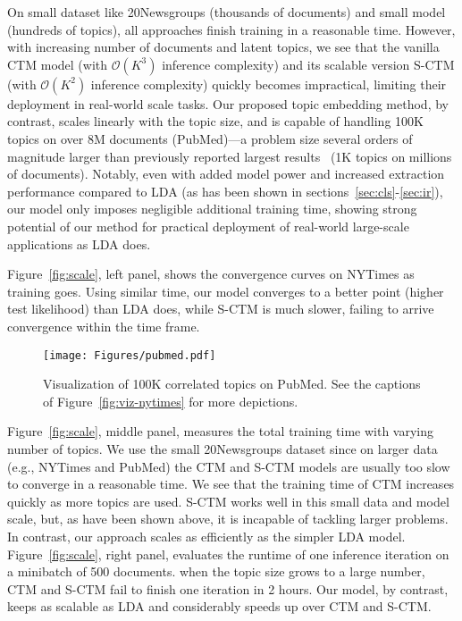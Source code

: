 \documentclass[sigconf]{acmart}
\begin{document}
On small dataset like 20Newsgroups (thousands of documents) and small model (hundreds of topics), all approaches finish training in a reasonable time. However, with increasing number of documents and latent topics, we see that the vanilla CTM model (with $\mathcal{O}(K^3)$ inference complexity) and its scalable version S-CTM (with $\mathcal{O}(K^2)$ inference complexity) quickly becomes impractical, limiting their deployment in real-world scale tasks. Our proposed topic embedding method, by contrast, scales linearly with the topic size, and is capable of handling 100K topics on over 8M documents (PubMed)---a problem size several orders of magnitude larger than previously reported largest results~\cite{chen2013scalable} (1K topics on millions of documents). Notably, even with added model power and increased extraction performance compared to LDA (as has been shown in sections~\ref{sec:cls}-\ref{sec:ir}), our model only imposes negligible additional training time, showing strong potential of our method for practical deployment of real-world large-scale applications as LDA does. 

Figure~\ref{fig:scale}, left panel, shows the convergence curves on NYTimes as training goes. Using similar time, our model converges to a better point (higher test likelihood) than LDA does, while S-CTM is much slower, failing to arrive convergence within the time frame.


\begin{figure}[!h]
\begin{center}
\texttt{[image: Figures/pubmed.pdf]}
\vspace{-10pt}
\caption{Visualization of 100K correlated topics on PubMed. See the captions of Figure~\ref{fig:viz-nytimes} for more depictions.}
\label{fig:pubmed}
\end{center}
\vspace{-10pt}
\end{figure}
%
Figure~\ref{fig:scale}, middle panel, measures the total training time with varying number of topics. We use the small 20Newsgroups dataset since on larger data (e.g., NYTimes and PubMed) the CTM and S-CTM models are usually too slow to converge in a reasonable time. We see that the training time of CTM increases quickly as more topics are used. S-CTM works well in this small data and model scale, but, as have been shown above, it is incapable of tackling larger problems. In contrast, our approach scales as efficiently as the simpler LDA model. Figure~\ref{fig:scale}, right panel, evaluates the runtime of one inference iteration on a minibatch of 500 documents. when the topic size grows to a large number, CTM and S-CTM fail to finish one iteration in 2 hours. Our model, by contrast, keeps as scalable as LDA and considerably speeds up over CTM and S-CTM. 
%
\end{document}

